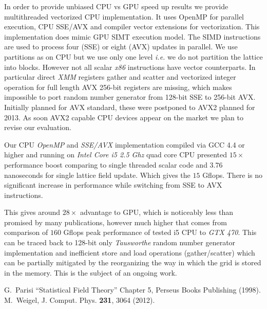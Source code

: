 \documentclass[a4paper]{llncs}
\begin{document}
In order to provide unbiased CPU vs GPU speed up results we provide
multithreaded vectorized CPU implementation. It uses OpenMP for
parallel execution, CPU SSE/AVX and compiler vector extensions for
vectorization.  This implementation does mimic GPU SIMT execution
model.  The SIMD instructions are used to process four (SSE) or eight
(AVX) updates in parallel. We use partitions as on CPU but we use only
one level {\em i.e.} we do not partition the lattice into blocks.
However not all scalar \emph{x86} instructions have vector
counterparts.  In particular direct \emph{XMM} registers gather and
scatter and vectorized integer operation for full length AVX 256-bit
registers are missing, which makes impossible to port random number
generator from 128-bit SSE to 256-bit AVX. Initially planned for AVX
standard, these were postponed to AVX2 planned for 2013. As soon AVX2
capable CPU devices appear on the market we plan to revise our
evaluation.


Our CPU \emph{OpenMP} and \emph{SSE/AVX} implementation compiled via
GCC 4.4 or higher and running on \emph{Intel Core i5 2.5 Ghz} quad
core CPU presented $15\times$ performance boost comparing to single
threaded scalar code and $3.76$ nanoseconds for single lattice field
update.  Which gives the $15$ Gflops. There is no significant increase
in performance while switching from SSE to AVX instructions.

This gives around $28\times$ advantage to GPU, which is noticeably
less than promised by many publications, however much higher that
comes from comparison of $160$ Gflops peak performance of tested i5
CPU to \emph{GTX 470}\cite{Lee:2010:DGV:1816038.1816021}. This can be
traced back to 128-bit only \emph{Tausworthe} random number generator
implementation and inefficient store and load operations
(gather/scatter) which can be partially mitigated by the reorganizing
the way in which the grid is stored in the memory. This is the subject
of an ongoing work.

\begin{thebibliography}{9}
 G.~Parisi ``Statistical Field Theory'' Chapter 5, Perseus Books Publishing (1998).
 M.~Weigel, J. Comput. Phys. \textbf{231}, 3064 (2012).
\end{thebibliography}
\end{document}
